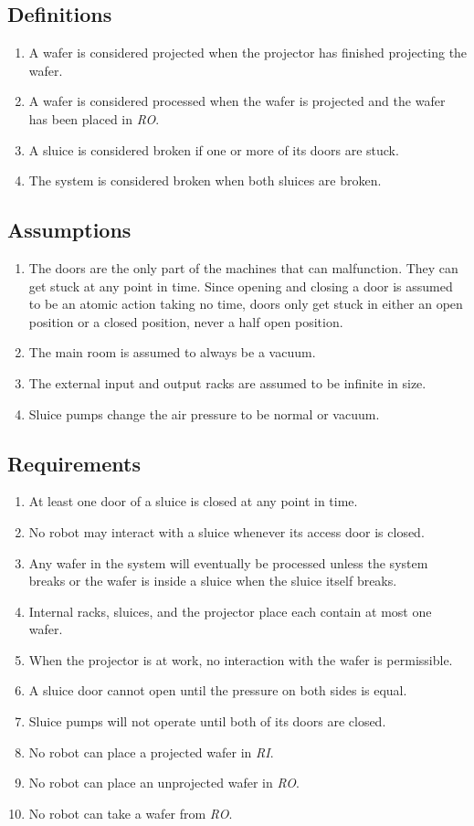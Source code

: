 \subsection{Definitions}
\begin{enumerate}
  \item A wafer is considered projected when the projector has finished projecting the wafer.
  \item A wafer is considered processed when the wafer is projected and the wafer has been placed in \textit{RO}.
  \item A sluice is considered broken if one or more of its doors are stuck.
  \item The system is considered broken when both sluices are broken.
\end{enumerate}

\subsection{Assumptions}
\begin{enumerate}
  \item The doors are the only part of the machines that can malfunction. They can get stuck at any point in time. Since opening and closing a door is assumed to be an atomic action taking no time, doors only get stuck in either an open position or a closed position, never a half open position.
  \item The main room is assumed to always be a vacuum.
  \item The external input and output racks are assumed to be infinite in size.
  \item Sluice pumps change the air pressure to be normal or vacuum.
\end{enumerate}

\subsection{Requirements}
\begin{enumerate}
  \item At least one door of a sluice is closed at any point in time.
  \item No robot may interact with a sluice whenever its access door is closed.
  \item Any wafer in the system will eventually be processed unless the system breaks or the wafer is inside a sluice when the sluice itself breaks.
  \item Internal racks, sluices, and the projector place each contain at most one wafer.
  \item When the projector is at work, no interaction with the wafer is permissible.
  \item A sluice door cannot open until the pressure on both sides is equal.
  \item Sluice pumps will not operate until both of its doors are closed.
  \item No robot can place a projected wafer in \textit{RI}.
  \item No robot can place an unprojected wafer in \textit{RO}.
  \item No robot can take a wafer from \textit{RO}.
\end{enumerate}